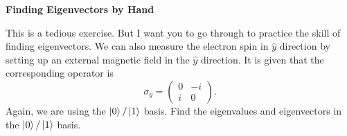 \documentclass[a4paper, 10pt]{article}
\begin{document}
\subject
{}

\begin{problem}
\textbf{Finding Eigenvectors by Hand}
\par This is a tedious exercise.
But I want you to go through to practice the skill of finding eigenvectors.
We can also measure the electron spin in \( \hat{y} \) direction by setting up an external magnetic field in the \( \hat{y} \) direction.
It is given that the corresponding operator is \[ \sigma_y = \begin{pmatrix}
		0 & -i \\
		i & 0
	\end{pmatrix}. \] Again, we are using the \( \ket{0}/\ket{1} \) basis.
Find the eigenvalues and eigenvectors in the \( \ket{0}/\ket{1} \) basis.
\end{problem}
\end{document}
